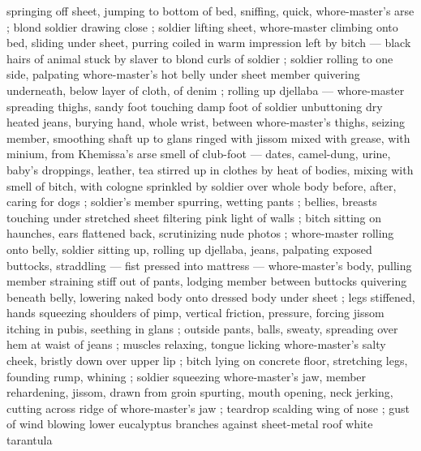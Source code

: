 springing off sheet, jumping to bottom of bed, sniffing, quick, whore-master's arse ; blond soldier drawing close  ; soldier lifting sheet, whore-master climbing onto bed, sliding under sheet, purring coiled in warm impression left by bitch --- black hairs of animal stuck by slaver to blond curls of soldier ; soldier rolling to one side, palpating whore-master's hot belly under sheet {\col} member quivering underneath, below layer of cloth, of denim ; rolling up djellaba --- whore-master spreading thighs, sandy foot touching damp foot of soldier {\dashcom} unbuttoning dry heated jeans, burying hand, whole wrist, between whore-master's thighs, seizing member, smoothing shaft up to glans ringed with jissom mixed with grease, with minium, from Khemissa's arse {\col} smell of club-foot --- dates, camel-dung, urine, baby's droppings, leather, tea {\dashcom} stirred up in clothes by heat of bodies, mixing with smell of bitch, with cologne sprinkled by soldier over whole body before, after, caring for dogs ; soldier's member spurring, wetting pants ; bellies, breasts touching under stretched sheet filtering pink light of walls ; bitch sitting on haunches, ears flattened back, scrutinizing nude photos ; whore-master rolling onto belly, soldier sitting up, rolling up djellaba, jeans, palpating exposed buttocks, straddling --- fist pressed into mattress --- whore-master's body, pulling member straining stiff out of pants, lodging member between buttocks quivering beneath belly, lowering naked body onto dressed body under sheet ; legs stiffened, hands squeezing shoulders of pimp, vertical friction, pressure, forcing jissom itching in pubis, seething in glans ; outside pants, balls, sweaty, spreading over hem at waist of jeans ; muscles relaxing, tongue licking whore-master's salty cheek, bristly down over upper lip ; bitch lying on concrete floor, stretching legs, founding rump, whining ; soldier squeezing whore-master's jaw, member rehardening, jissom, drawn from groin spurting, mouth opening, neck jerking, cutting across ridge of whore-master's jaw ; teardrop scalding wing of nose ; gust of wind blowing lower eucalyptus branches against sheet-metal roof {\col} white tarantula 

